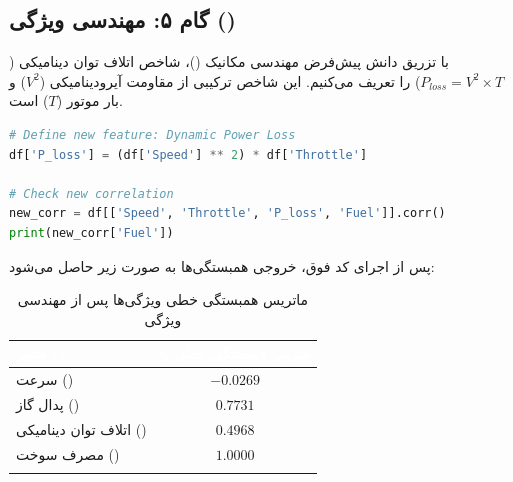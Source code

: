 \documentclass{article}
\begin{document}
\subsection{گام ۵: مهندسی ویژگی ()}

با تزریق دانش پیش‌فرض مهندسی مکانیک ()، شاخص اتلاف توان دینامیکی ($P_{loss} = V^2 \times T$) را تعریف می‌کنیم. این شاخص ترکیبی از مقاومت آیرودینامیکی ($V^2$) و بار موتور ($T$) است.

\begin{latin}
	\begin{lstlisting}[language=Python, caption={Feature Engineering and Correlation Check}]
# Define new feature: Dynamic Power Loss
df['P_loss'] = (df['Speed'] ** 2) * df['Throttle']

# Check new correlation
new_corr = df[['Speed', 'Throttle', 'P_loss', 'Fuel']].corr()
print(new_corr['Fuel'])
	\end{lstlisting}
\end{latin}

پس از اجرای کد فوق، خروجی همبستگی‌ها به صورت زیر حاصل می‌شود:

\vspace{0.2cm}
\begin{table}[H]
	\centering
	\renewcommand{\arraystretch}{1.5}
	\begin{tabular}{!{\vrule width 1pt}l|c!{\vrule width 1pt}} 
		\textcolor{white}{\textbf{متغیر ()}} & \textcolor{white}{\textbf{ضریب همبستگی خطی با }} \\
		\hline
		سرعت () & $-0.0269$ \\
		\hline
		پدال گاز () & $0.7731$ \\
		\hline
		اتلاف توان دینامیکی () & $\mathbf{0.4968}$ \\
		\hline
		مصرف سوخت () & $1.0000$ \\
	\end{tabular}
	\caption{ماتریس همبستگی خطی ویژگی‌ها پس از مهندسی ویژگی}
\end{table}
\end{document}
